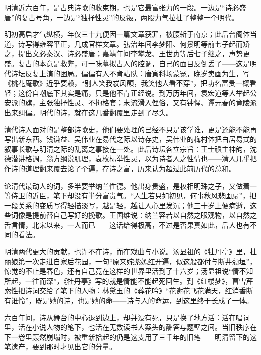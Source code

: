 
\begin{intro}
明清近六百年，是古典诗歌的收束期，也是它最富张力的一段。一边是“诗必盛唐”的复古号角，一边是“独抒性灵”的反叛，两股力气拉扯了整整一个明代。

明初高启才气纵横，年仅三十九便因一篇文章获罪，被腰斩于南京；此后台阁体当道，诗写得雍容平正，几成官样文章。弘治年间李梦阳、何景明等前七子起而矫之，提出文必秦汉、诗必盛唐；嘉靖年间李攀龙、王世贞等后七子继之，声势更盛。复古的本意是救弊，可一味摹拟古人的腔调，自己的面目反倒丢了——这是明代诗坛反复上演的困局。偏偏有人不肯站队：唐寅科场蒙冤，晚岁卖画为生，写《桃花庵歌》近乎耍赖，“别人笑我忒风颠，我笑他人看不穿”，把功名富贵一概看轻；这份自嘲底下其实是痛，只是他不肯正经说。到万历年间，袁宏道等人举起公安派的旗，主张独抒性灵、不拘格套；末流滑入俚俗，又有钟惺、谭元春的竟陵派出来纠偏。明代的诗，就在这几番翻覆里走到了尽头。

清代诗人面对的是整部诗歌史，他们要处理的已经不只是该学谁，更是还能不能再写出新东西。钱谦益、吴伟业在易代之际以诗存史，吴伟业的梅村体把白居易式的叙事长歌与明清之际的乱离之事接在一处。此后诗坛各立宗旨：王士禛主神韵，沈德潜讲格调，翁方纲说肌理，袁枚标举性灵，以为诗者人之性情也——清人几乎把作诗的道理翻来覆去论了个遍，存诗之富，历来认为超过此前历代的总和。

论清代最动人的词，多半要举纳兰性德。他出身贵盛，是权相明珠之子，又做着一等侍卫的近臣，笔下却没有半分富贵气。“人生若只如初见，何事秋风悲画扇”，把一段关系的变质写得轻描淡写，越是轻，越让人心里发沉；他三十岁上便病逝，这些词像是提前替自己写好的挽歌。王国维说：纳兰容若以自然之眼观物，以自然之舌言情，北宋以来，一人而已——这话给得极高，不过是否果真如此，后人也有不同的看法。

明清两代更大的贡献，也许不在诗，而在戏曲与小说。汤显祖的《牡丹亭》里，杜丽娘第一次走进自家后花园，一句“原来姹紫嫣红开遍，似这般都付与断井颓垣”，惊觉的不止是春色，还有自己竟在这样的世界里活到了十六岁；汤显祖说“情不知所起，一往而深”，《牡丹亭》写的就是情能不能起死回生。到《红楼梦》，曹雪芹索性把诗词交给了笔下的人物：林黛玉的《葬花吟》“花谢花飞花满天，红消香断有谁怜”，既是她的诗，也是她的命——诗与人的命运，到这里终于长成了一体。

六百年间，诗从舞台的中心退到边上，却并没有死，只是换了地方活：活在唱词里，活在小说人物的笔下，也活在无数读书人案头的酬答与题壁之间。当旧秩序在下一卷里轰然崩塌时，被重新拾起的仍是这支用了三千年的旧笔——明清留下的这笔遗产，要到那时才见出它的分量。
\end{intro}
